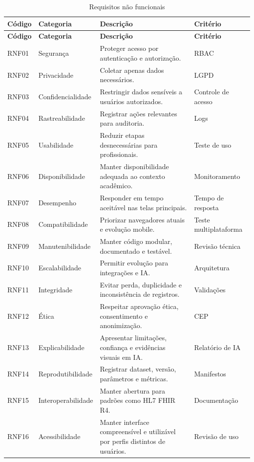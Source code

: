 \documentclass[
    12pt,
    oneside,
    a4paper,
    chapter=TITLE,
    brazil,
    sumario=tradicional,
    hidelinks
]{abntex2}
\begin{document}
\begin{longtable}{L{1.7cm}L{3.0cm}L{6.8cm}L{2.3cm}}
\caption{\label{tab:requisitos-nao-funcionais}Requisitos não funcionais}\\
\toprule
\textbf{Código} & \textbf{Categoria} & \textbf{Descrição} & \textbf{Critério} \\
\midrule
\endfirsthead
\toprule
\textbf{Código} & \textbf{Categoria} & \textbf{Descrição} & \textbf{Critério} \\
\midrule
\endhead
RNF01 & Segurança & Proteger acesso por autenticação e autorização. & RBAC \\
RNF02 & Privacidade & Coletar apenas dados necessários. & LGPD \\
RNF03 & Confidencialidade & Restringir dados sensíveis a usuários autorizados. & Controle de acesso \\
RNF04 & Rastreabilidade & Registrar ações relevantes para auditoria. & Logs \\
RNF05 & Usabilidade & Reduzir etapas desnecessárias para profissionais. & Teste de uso \\
RNF06 & Disponibilidade & Manter disponibilidade adequada ao contexto acadêmico. & Monitoramento \\
RNF07 & Desempenho & Responder em tempo aceitável nas telas principais. & Tempo de resposta \\
RNF08 & Compatibilidade & Priorizar navegadores atuais e evolução mobile. & Teste multiplataforma \\
RNF09 & Manutenibilidade & Manter código modular, documentado e testável. & Revisão técnica \\
RNF10 & Escalabilidade & Permitir evolução para integrações e IA. & Arquitetura \\
RNF11 & Integridade & Evitar perda, duplicidade e inconsistência de registros. & Validações \\
RNF12 & Ética & Respeitar aprovação ética, consentimento e anonimização. & CEP \\
RNF13 & Explicabilidade & Apresentar limitações, confiança e evidências visuais em IA. & Relatório de IA \\
RNF14 & Reprodutibilidade & Registrar dataset, versão, parâmetros e métricas. & Manifestos \\
RNF15 & Interoperabilidade & Manter abertura para padrões como HL7 FHIR R4. & Documentação \\
RNF16 & Acessibilidade & Manter interface compreensível e utilizável por perfis distintos de usuários. & Revisão de uso \\
\bottomrule
\end{longtable}
\end{document}
